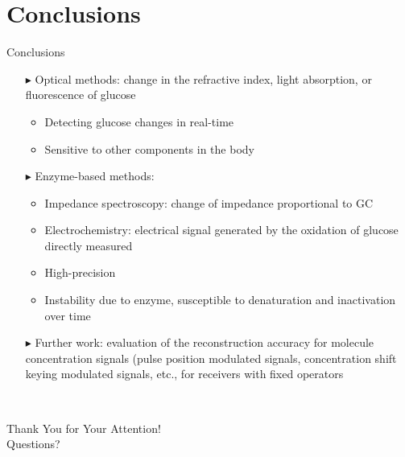 \documentclass[fontsize=11pt,aspectratio=169,t,fleqn]{beamer}
\begin{document}
\section{Conclusions}
\begin{frame}{Conclusions}
  \begin{itemize}
    \item [$\blacktriangleright$] Optical methods: change in the refractive index, light absorption, or
    fluorescence of glucose
        \begin{itemize}
          \item Detecting glucose changes in real-time
          \item Sensitive to other components in the body
        \end{itemize}

    \item [$\blacktriangleright$]Enzyme-based methods:
        \begin{itemize}
        \item Impedance spectroscopy: change of impedance proportional to GC 
        \item Electrochemistry: electrical signal generated by the oxidation of glucose directly measured 
        \item High-precision
        \item Instability due to enzyme, susceptible to denaturation and inactivation over time 
        
    \end{itemize}
    \item [$\blacktriangleright$]Further work: evaluation of the reconstruction accuracy for molecule concentration signals (pulse position modulated signals, concentration shift keying modulated
    signals, etc., for receivers with fixed operators
  \end{itemize}
   \
\end{frame}
 

\begin{frame}
\centering
\vspace{.3\textheight}
\huge Thank You for Your Attention!\\
\pause
\vspace{1cm}
\huge Questions?
\end{frame}
\end{document}
